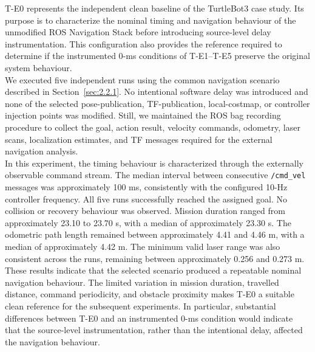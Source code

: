 T-E0 represents the independent clean baseline of the TurtleBot3 case study. Its purpose is to characterize the nominal timing and navigation behaviour of the unmodified ROS Navigation Stack before introducing source-level delay instrumentation. This configuration also provides the reference required to determine if the instrumented 0-ms conditions of T-E1--T-E5 preserve the original system behaviour.
\\
We executed five independent runs using the common navigation scenario described in Section~\ref{sec:2.2.1}. No intentional software delay was introduced and none of the selected pose-publication, TF-publication, local-costmap, or controller injection points was modified. Still, we maintained the ROS bag recording procedure to collect the goal, action result, velocity commands, odometry, laser scans, localization estimates, and TF messages required for the external navigation analysis.
\\
In this experiment, the timing behaviour is characterized through the externally observable command stream. The median interval between consecutive \texttt{/cmd\_vel} messages was approximately 100 ms, consistently with the configured 10-Hz controller frequency.
All five runs successfully reached the assigned goal. No collision or recovery behaviour was observed. Mission duration ranged from approximately 23.10 to 23.70 s, with a median of approximately 23.30 s. The odometric path length remained between approximately 4.41 and 4.46 m, with a median of approximately 4.42 m. The minimum valid laser range was also consistent across the runs, remaining between approximately 0.256 and 0.273 m.
These results indicate that the selected scenario produced a repeatable nominal navigation behaviour. The limited variation in mission duration, travelled distance, command periodicity, and obstacle proximity makes T-E0 a suitable clean reference for the subsequent experiments. In particular, substantial differences between T-E0 and an instrumented 0-ms condition would indicate that the source-level instrumentation, rather than the intentional delay, affected the navigation behaviour. 

